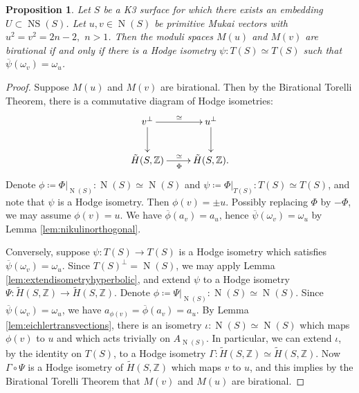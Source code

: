 \documentclass[11pt,twoside]{amsart}
\numberwithin{equation}{section}
\newtheorem{proposition}[dummy]{Proposition}
\theoremstyle{definition}
\theoremstyle{plain}
\newcommand{\Z}{\ensuremath{\mathbb{Z}}}
\def\NS{\operatorname{NS}}
\def\N{\operatorname{N}}
\begin{document}
\begin{proposition}\label{prop:birationaliffcaldararuclass}
    Let $S$ be a K3 surface for which there exists an embedding $U\subset \NS(S)$. Let $u,v\in \operatorname{N}(S)$ be primitive Mukai vectors with $u^2=v^2=2n-2,$ $n>1$. Then the moduli spaces $M(u)$ and $M(v)$ are birational if and only if there is a Hodge isometry $\psi:T(S)\simeq T(S)$ such that $\overline{\psi}(\omega_v) = \omega_u$.
\end{proposition}
\begin{proof}
    Suppose $M(u)$ and $M(v)$ are birational. Then by the Birational Torelli Theorem, there is a commutative diagram of Hodge isometries:
    \begin{equation}
        \xymatrix{
        v^\perp \ar[d] \ar^\simeq[r] & u^\perp \ar[d]\\
        \tilde{H}(S,\Z) \ar^\simeq_\Phi[r] & \tilde{H}(S,\Z).
        }
    \end{equation}
    Denote $\phi\coloneqq \Phi|_{\N(S)}: \N(S)\simeq \N(S)$ and $\psi\coloneqq \Phi|_{T(S)}: T(S)\simeq T(S)$, and note that $\psi$ is a Hodge isometry. Then $\phi(v) = \pm u$. Possibly replacing $\Phi$ by $-\Phi$, we may assume $\phi(v) = u$. We have $\overline{\phi}(a_v)=a_u$, hence $\overline{\psi}(\omega_v) = \omega_u$ by Lemma \ref{lem:nikulinorthogonal}.

    Conversely, suppose $\psi: T(S)\to T(S)$ is a Hodge isometry which satisfies $\overline{\psi}(\omega_v) = \omega_u$. Since $T(S)^\perp = \N(S)$, we may apply Lemma \ref{lem:extendisometryhyperbolic}, and extend $\psi$ to a Hodge isometry $\Psi:
    \tilde{H}(S,\Z)\to \tilde{H}(S,\Z)$. Denote $\phi\coloneqq\Psi|_{\N(S)}: \N(S)\simeq \N(S)$. 
    Since $\overline{\psi}(\omega_v) = \omega_u$, we have $a_{\phi(v)} = \overline{\phi}(a_{v}) = a_u$. By Lemma \ref{lem:eichlertransvections}, there is an isometry $\iota: \N(S)\simeq \N(S)$ which maps $\phi(v)$ to $u$ and which acts trivially on $A_{\N(S)}$. In particular, we can extend $\iota$, by the identity on $T(S)$, to a Hodge isometry  $\Gamma: \tilde{H}(S,\Z)\simeq \tilde{H}(S,\Z)$. Now $\Gamma\circ \Psi$ is a Hodge isometry of $\tilde{H}(S,\Z)$ which maps $v$ to $u$, and this implies by the Birational Torelli Theorem that $M(v)$ and $M(u)$ are birational.
\end{proof}
\end{document}
